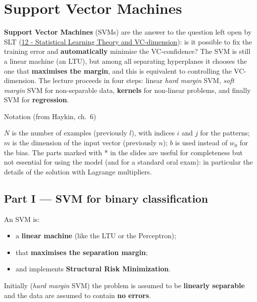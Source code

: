 \chapter{Support Vector Machines}\label{ch-13}

\textbf{Support Vector Machines} (SVMs) are the answer to the question
left open by SLT
(\href{12\%20-\%20Statistical\%20Learning\%20Theory\%20e\%20VC-dimension}{12
- Statistical Learning Theory and VC-dimension}): is it possible to fix
the training error and \textbf{automatically} minimise the
VC-confidence? The SVM is still a linear machine (an LTU), but among
all separating hyperplanes it chooses the one that \textbf{maximises
the margin}, and this is equivalent to controlling the VC-dimension.
The lecture proceeds in four steps: linear \emph{hard margin} SVM,
\emph{soft margin} SVM for non-separable data, \textbf{kernels} for
non-linear problems, and finally SVM for \textbf{regression}.

\begin{boxnote}{Notation (from Haykin, ch.\ 6)}

\(N\) is the number of examples (previously \(l\)), with indices \(i\)
and \(j\) for the patterns; \(m\) is the dimension of the input vector
(previously \(n\)); \(b\) is used instead of \(w_0\) for the bias. The
parts marked with * in the slides are useful for completeness but not
essential for using the model (and for a standard oral exam): in
particular the details of the solution with Lagrange multipliers.

\end{boxnote}

\section{Part I --- SVM for binary
classification}\label{parte-i-svm-per-la-classificazione-binaria}

An SVM is:

\begin{itemize}
\tightlist
\item
  a \textbf{linear machine} (like the LTU or the Perceptron);
\item
  that \textbf{maximises the separation margin};
\item
  and implements \textbf{Structural Risk Minimization}.
\end{itemize}

Initially (\emph{hard margin} SVM) the problem is assumed to be
\textbf{linearly separable} and the data are assumed to contain
\textbf{no errors}.

